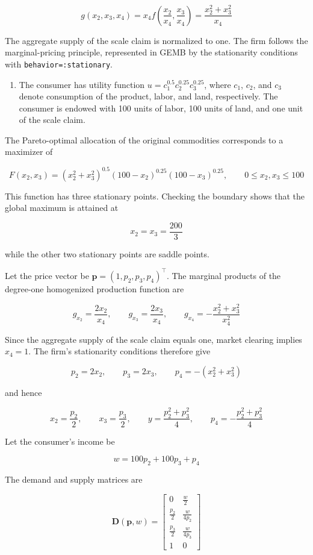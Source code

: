 \documentclass[
  letterpaper,
  DIV=11,
  numbers=noendperiod]{scrreprt}
\providecommand{\tightlist}{%
  \setlength{\itemsep}{0pt}\setlength{\parskip}{0pt}}\usepackage{longtable,booktabs,array}
\begin{document}
\[
g(x_2,x_3,x_4)
=
x_4 f\left(\frac{x_2}{x_4},\frac{x_3}{x_4}\right)
=
\frac{x_2^2+x_3^2}{x_4}
\]

The aggregate supply of the scale claim is normalized to one. The firm
follows the marginal-pricing principle, represented in GEMB by the
stationarity conditions with \texttt{behavior=:stationary}.

\begin{enumerate}
\def\labelenumi{\arabic{enumi}.}
\setcounter{enumi}{2}
\tightlist
\item
  The consumer has utility function \(u=c_1^{0.5}c_2^{0.25}c_3^{0.25}\),
  where \(c_1\), \(c_2\), and \(c_3\) denote consumption of the product,
  labor, and land, respectively. The consumer is endowed with 100 units
  of labor, 100 units of land, and one unit of the scale claim.
\end{enumerate}

The Pareto-optimal allocation of the original commodities corresponds to
a maximizer of

\[
F(x_2,x_3)
=
(x_2^2+x_3^2)^{0.5}
(100-x_2)^{0.25}
(100-x_3)^{0.25},
\qquad
0\leq x_2,x_3\leq100
\]

This function has three stationary points. Checking the boundary shows
that the global maximum is attained at

\[
x_2=x_3=\frac{200}{3}
\]

while the other two stationary points are saddle points.

Let the price vector be \(\mathbf p=(1,p_2,p_3,p_4)^\top\). The marginal
products of the degree-one homogenized production function are

\[
g_{x_2}
=
\frac{2x_2}{x_4},
\qquad
g_{x_3}
=
\frac{2x_3}{x_4},
\qquad
g_{x_4}
=
-\frac{x_2^2+x_3^2}{x_4^2}
\]

Since the aggregate supply of the scale claim equals one, market
clearing implies \(x_4=1\). The firm's stationarity conditions therefore
give

\[
p_2=2x_2,
\qquad
p_3=2x_3,
\qquad
p_4=-(x_2^2+x_3^2)
\]

and hence

\[
x_2=\frac{p_2}{2},
\qquad
x_3=\frac{p_3}{2},
\qquad
y=\frac{p_2^2+p_3^2}{4},
\qquad
p_4=-\frac{p_2^2+p_3^2}{4}
\]

Let the consumer's income be

\[
w=100p_2+100p_3+p_4
\]

The demand and supply matrices are

\[
\mathbf D(\mathbf p,w)
=
\begin{bmatrix}
0 & \frac{w}{2}\\
\frac{p_2}{2} & \frac{w}{4p_2}\\
\frac{p_3}{2} & \frac{w}{4p_3}\\
1 & 0
\end{bmatrix}
\]
\end{document}
